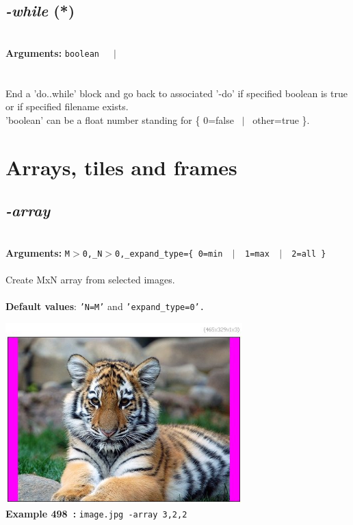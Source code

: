 \documentclass[a4paper,11pt,twoside]{book}
\begin{document}
\subsection{\emph{-while} (*)}\vspace*{-0.5em}
~\\\textbf{Arguments: } 
{\small \texttt{boolean}}~~~$|$\\
\\~\\
End a 'do..while' block and go back to associated '-do'
if specified boolean is true or if specified filename exists.
~\\'boolean' can be a float number standing for \{ 0=false ~$|$~ other=true \}.

\section{Arrays, tiles and frames}


\subsection{\emph{-array} }\vspace*{-0.5em}
~\\\textbf{Arguments: } 
{\small \texttt{M$>$0,\_N$>$0,\_expand\_type=\{ 0=min ~$|$~ 1=max ~$|$~ 2=all \}}}\\~\\
Create MxN array from selected images.
~\\~\\\textbf{Default values}: {\small \texttt{'N=M'} and \texttt{'expand\_type=0'.}}
\begin{center}\includegraphics[keepaspectratio=true,height=7cm,width=\textwidth]{img/gmic_def498.jpg}\\
{\footnotesize \textbf{Example 498~:} \texttt{image.jpg -array 3,2,2}}
\end{center}
\end{document}
